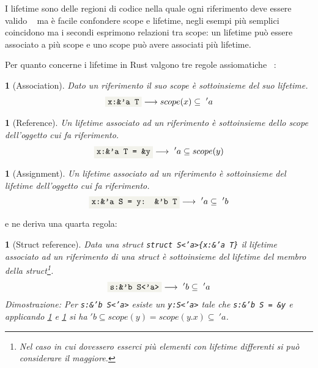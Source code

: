 \documentclass[Lau,binding=0.6cm]{sapthesis}
\newtheorem{lemma}[theorem]{}
\newcommand{\textcode}[1]{\colorbox{backcolour}{\texttt{#1}}}
\begin{document}
I lifetime sono delle regioni di codice nella quale ogni riferimento deve essere valido ~\cite[3.3]{rust:rustonomicon} ma è facile confondere scope e lifetime, negli esempi più semplici coincidono ma i secondi esprimono relazioni tra scope: un lifetime può essere associato a più scope e uno scope può avere associati più lifetime. 

Per quanto concerne i lifetime in Rust valgono tre regole assiomatiche ~\cite{mechpen:misundestand}:

\begin{lemma}[Association] \label{lemma:association}
    Dato un riferimento il suo scope è sottoinsieme del suo lifetime.
    \begin{equation*}
        \textnormal{\textcode{x:\&'a T}} \longrightarrow  scope(x) \subseteq \ 'a
    \end{equation*}
\end{lemma}

\begin{lemma}[Reference] \label{lemma:reference}
    Un lifetime associato ad un riferimento è sottoinsieme dello scope dell'oggetto cui fa riferimento. 
    \begin{equation*}
        \textnormal{\textcode{x:\&'a T = \&y}} \longrightarrow \ 'a \subseteq scope(y)
    \end{equation*}
\end{lemma}

\begin{lemma}[Assignment] \label{lemma:assignment}
    Un lifetime associato ad un riferimento è sottoinsieme del lifetime dell'oggetto cui fa riferimento.
    \begin{equation*}
        \textnormal{\textcode{x:\&'a S = y: \&'b T}} \longrightarrow \ 'a \subseteq \ 'b
    \end{equation*}
\end{lemma}

e ne deriva una quarta regola:

\begin{lemma}[Struct reference] \label{lemma:struct_reference}
    Data una struct \textnormal{\textcode{struct S<'a>\{x:\&'a T\}}} il lifetime associato ad un riferimento di una struct è sottoinsieme del lifetime del membro della struct\footnote{Nel caso in cui dovessero esserci più elementi con lifetime differenti si può considerare il maggiore.}.
    \begin{equation*}
        \textnormal{\textcode{s:\&'b S<'a>}} \longrightarrow \ 'b \subseteq \ 'a
    \end{equation*}
    Dimostrazione: \textnormal{Per \textnormal{\textcode{s:\&'b S<'a>}} esiste un \textcode{y:S<'a>} tale che \textcode{s:\&'b S = \&y} e applicando \ref{lemma:reference} e \ref{lemma:association} si ha} $ 'b \subseteq scope(y) = scope(y.x) \subseteq \ 'a  $.
\end{lemma}
\end{document}
